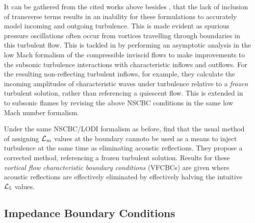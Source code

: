 It can be gathered from the cited works above besides \cite{yoo2007CharacteristicBoundaryConditions}, that the lack of inclusion of transverse terms results in an inability for these formulations to accurately model incoming and outgoing turbulence. This is made evident as spurious pressure oscillations often occur from vortices travelling through boundaries in this turbulent flow. This is tackled in \cite{prosser2005ImprovedBoundaryConditions} by performing an asymptotic analysis in the low Mach formalism of the compressible inviscid flows to make improvements to the subsonic turbulence interactions with characteristic inflows and outflows. For the resulting non-reflecting turbulent inflows, for example, they calculate the incoming amplitudes of characteristic waves under turbulence relative to a \emph{frozen} turbulent solution, rather than referencing a quiescent flow. This is extended in \cite{prosser2011ImprovedBoundaryConditions} to subsonic flames by revising the above NSCBC conditions in the same low Mach number formalism.

Under the same NSCBC/LODI formalism as before, \cite{guezennec2009AcousticallyNonreflectingReflecting} find that the usual method of assigning $\mathcal{L}_m$ values at the boundary cannoto be used as a means to inject turbulence at the same time as eliminating acoustic reflections. They propose a corrected method, referencing a frozen turbulent solution. Results for these \emph{vortical flow characteristic boundary conditions} (VFCBCs) are given where acoustic reflections are effectively eliminated by effectively halving the intuitive $\mathcal{L}_5$ values.









\subsection{Impedance Boundary Conditions}

